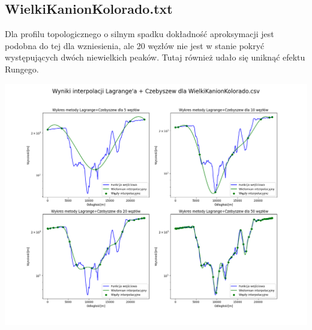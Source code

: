 \documentclass[a4paper,12pt]{article}
\begin{document}
	\subsection{WielkiKanionKolorado.txt}
	Dla profilu topologicznego o silnym spadku dokładność aproksymacji jest podobna do tej dla wzniesienia, ale 20 węzłów nie jest w stanie pokryć występujących dwóch niewielkich peaków. Tutaj również udało się uniknąć efektu Rungego.
	\begin{center}
        \includegraphics[scale=0.4]{../charts/chebyshev_WielkiKanionKolorado.png}
    \end{center}
\end{document}
